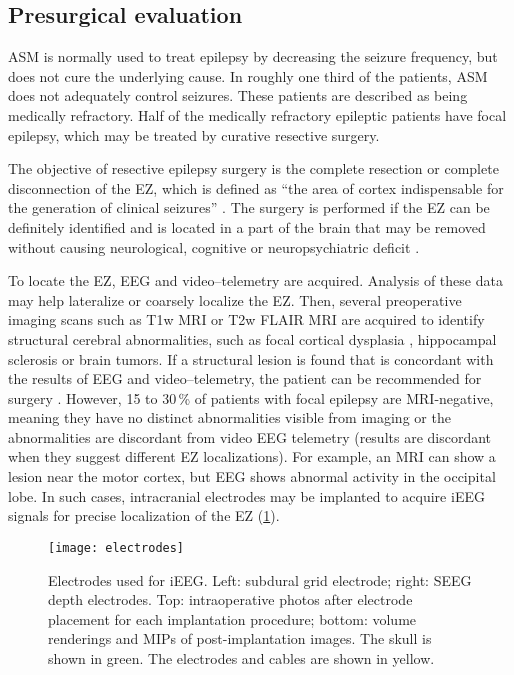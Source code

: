 \subsection{Presurgical evaluation}

\Ac{ASM} is normally used to treat epilepsy by decreasing the seizure frequency, but does not cure the underlying cause.
In roughly one third of the patients, \ac{ASM} does not adequately control seizures.
These patients are described as being medically refractory.
Half of the medically refractory epileptic patients have focal epilepsy, which may be treated by curative resective surgery.

The objective of resective epilepsy surgery is the complete resection or complete disconnection of the \ac{EZ}, which is defined as ``the area of cortex indispensable for the generation of clinical seizures'' \cite{rosenow_presurgical_2001}.
The surgery is performed if the \ac{EZ} can be definitely identified and is located in a part of the brain that may be removed without causing neurological, cognitive or neuropsychiatric deficit \cite{jobst_resective_2015}.

To locate the \ac{EZ}, \ac{EEG} and video--telemetry are acquired.
Analysis of these data may help lateralize or coarsely localize the \ac{EZ}.
Then, several preoperative imaging scans such as \ac{T1w} \ac{MRI} or \ac{T2w} \ac{FLAIR} \ac{MRI} are acquired to identify structural cerebral abnormalities, such as focal cortical dysplasia \cite{kabat_focal_2012}, hippocampal sclerosis \cite{thom_review_2014} or brain tumors.
If a structural lesion is found that is concordant with the results of \ac{EEG} and video--telemetry, the patient can be recommended for surgery \cite{duncan_brain_2016}.
However, 15 to 30\,\% of patients with focal epilepsy are \ac{MRI}-negative, meaning they have no distinct abnormalities visible from imaging or the abnormalities are discordant from video \ac{EEG} telemetry \cite{bien_characteristics_2009} (results are discordant when they suggest different \ac{EZ} localizations).
For example, an \ac{MRI} can show a lesion near the motor cortex, but \ac{EEG} shows abnormal activity in the occipital lobe.
In such cases, intracranial electrodes may be implanted to acquire \ac{iEEG} signals for precise localization of the \ac{EZ} (\cref{fig:electrodes}).

\begin{figure}[hbt!]
  \centering
  \texttt{[image: electrodes]}
  \caption[Electrodes used for intracranial EEG]{
    Electrodes used for \acf*{iEEG}.
    Left: subdural grid electrode;
    right: \acf*{SEEG} depth electrodes.
    Top: intraoperative photos after electrode placement for each implantation procedure;
    bottom: volume renderings and \acfp*{MIP} of post-implantation images.
    The skull is shown in green.
    The electrodes and cables are shown in yellow.
  }\label{fig:electrodes}
\end{figure}

